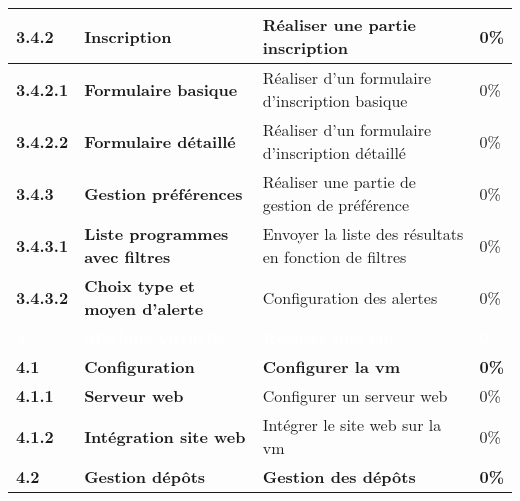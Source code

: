 \begin{supertabular}{|p{2.2cm} p{6cm}|p{5cm}|R{2cm}|}
  \hspace{6pt}
  \textbf{3.4.2}  & \textbf{Inscription} & Réaliser une partie inscription & 0\% \\
  \hline

  \hspace{12pt}
  \textbf{3.4.2.1}  & \textbf{Formulaire basique} & Réaliser d'un formulaire d'inscription basique & 0\% \\
  \hline

  \hspace{12pt}
  \textbf{3.4.2.2}  & \textbf{Formulaire détaillé} & Réaliser d'un formulaire d'inscription détaillé & 0\% \\
  \hline

  \hspace{6pt}
  \textbf{3.4.3}  & \textbf{Gestion préférences} & Réaliser une partie de gestion de préférence & 0\% \\
  \hline

  \hspace{12pt}
  \textbf{3.4.3.1}  & \textbf{Liste programmes avec filtres} & Envoyer la liste des résultats en fonction de filtres & 0\% \\
  \hline

  \hspace{12pt}
  \textbf{3.4.3.2}  & \textbf{Choix type et moyen d'alerte} & Configuration des alertes & 0\% \\
  \hline





  \textcolor{white}{\textbf{4}}  & \textcolor{white}{\textbf{Machine virtuelle}} & \textcolor{white}{\textbf{Réaliser une vm}} & \textcolor{white}{\textbf{0\%}} \\
  \hline

  \textbf{4.1}  & \textbf{Configuration} & \textbf{Configurer la vm} & \textbf{0\%} \\
  \hline

  \hspace{6pt}
  \textbf{4.1.1}  & \textbf{Serveur web} & Configurer un serveur web & 0\% \\
  \hline

  \hspace{6pt}
  \textbf{4.1.2}  & \textbf{Intégration site web} & Intégrer le site web sur la vm & 0\% \\
  \hline

  \textbf{4.2}  & \textbf{Gestion dépôts} & \textbf{Gestion des dépôts} & \textbf{0\%} \\
  \hline



\end{supertabular}
